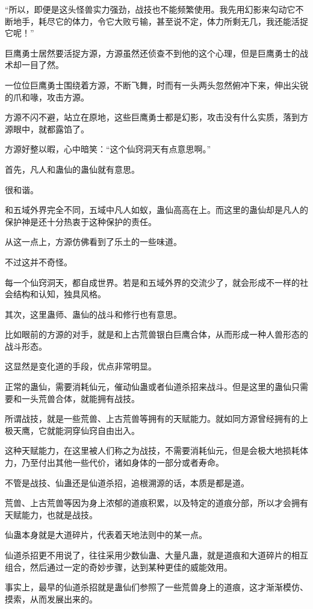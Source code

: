 \begin{this_body}
“所以，即便是这头怪兽实力强劲，战技也不能频繁使用。我先用幻影来勾动它不断地手，耗尽它的体力，令它大败亏输，甚至说不定，体力所剩无几，我还能活捉它呢！”

巨鹰勇士居然要活捉方源，方源虽然还侦查不到他的这个心理，但是巨鹰勇士的战术却一目了然。

一位位巨鹰勇士围绕着方源，不断飞舞，时而有一头两头忽然俯冲下来，伸出尖锐的爪和喙，攻击方源。

方源不闪不避，站立在原地，这些巨鹰勇士都是幻影，攻击没有什么实质，落到方源眼中，就都露馅了。

方源好整以暇，心中暗笑：“这个仙窍洞天有点意思啊。”

首先，凡人和蛊仙的蛊仙就有意思。

很和谐。

和五域外界完全不同，五域中凡人如蚁，蛊仙高高在上。而这里的蛊仙却是凡人的保护神是还十分热衷于这种保护的责任。

从这一点上，方源仿佛看到了乐土的一些味道。

不过这并不奇怪。

每一个仙窍洞天，都自成世界。若是和五域外界的交流少了，就会形成不一样的社会结构和认知，独具风格。

其次，这里蛊师、蛊仙的战斗和修行也有意思。

比如眼前的方源的对手，就是和上古荒兽银白巨鹰合体，从而形成一种人兽形态的战斗形态。

这显然是变化道的手段，优点非常明显。

正常的蛊仙，需要消耗仙元，催动仙蛊或者仙道杀招来战斗。但是这里的蛊仙只需要和一头荒兽合体，就能拥有战技。

所谓战技，就是一些荒兽、上古荒兽等拥有的天赋能力。就如同方源曾经拥有的上极天鹰，它就能洞穿仙窍自由出入。

这种天赋能力，在这里被人们称之为战技，不需要消耗仙元，但是会极大地损耗体力，乃至付出其他一些代价，诸如身体的一部分或者寿命。

不管是战技、仙蛊还是仙道杀招，追根溯源的话，本质是都是道。

荒兽、上古荒兽等因为身上浓郁的道痕积累，以及特定的道痕分部，所以才会拥有天赋能力，也就是战技。

仙蛊本身就是大道碎片，代表着天地法则中的某一点。

仙道杀招更不用说了，往往采用少数仙蛊、大量凡蛊，就是道痕和大道碎片的相互组合，然后通过一定的奇妙步骤，达到某种更佳的威能效用。

事实上，最早的仙道杀招就是蛊仙们参照了一些荒兽身上的道痕，这才渐渐模仿、摸索，从而发展出来的。


\end{this_body}
